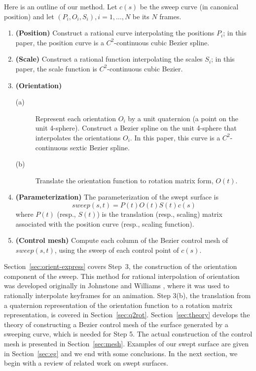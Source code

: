 \documentclass[times]{article}
\begin{document}
Here is an outline of our method.
Let $c(s)$ be the sweep curve (in canonical position) and 
let $(P_i,O_i,S_i), i = 1,\ldots,N$ be its $N$ frames.

\begin{enumerate}
\item
	{\bf (Position)} Construct a rational curve
	interpolating the positions $P_i$;
	in this paper, the position curve is 
	a $C^2$-continuous cubic Bezier spline.
\item
	{\bf (Scale)} Construct a rational function
	interpolating the scales $S_i$; in this paper, 
	the scale function is $C^2$-continuous cubic Bezier.
\item
	{\bf (Orientation)}
\begin{description}
\item[(a)]
	Represent each orientation $O_i$ by a unit quaternion
	(a point on the unit 4-sphere).
	Construct a Bezier spline on the unit 4-sphere
	that interpolates the orientations $O_i$.
	In this paper, this curve is a $C^2$-continuous sextic Bezier spline.
\item[(b)]
	Translate the orientation function to rotation matrix form, $O(t)$.
\end{description}
\item 
	{\bf (Parameterization)}
	The parameterization of the swept surface is
\begin{equation}
\label{eqn:matrix}
	sweep(s,t) = P(t)O(t)S(t)c(s)
\end{equation}
	where $P(t)$ (resp., $S(t)$) is the translation (resp., scaling)
	matrix associated with the position curve (resp., scaling function).
\item
	{\bf (Control mesh)}
	Compute each column of the Bezier control mesh of $sweep(s,t)$,
	using the sweep of each control point of $c(s)$.
\end{enumerate}

Section~\ref{sec:orient-express} covers Step~3,
the construction of the orientation component of the sweep.
This method for rational interpolation of orientation
was developed originally in Johnstone and Williams \cite{jjjimbo94a}, 
where it was used to rationally interpolate keyframes for an animation.
Step 3(b), the translation from a quaternion representation of the
orientation function to a rotation matrix representation, is covered
in Section~\ref{sec:q2rot}.
Section~\ref{sec:theory} develops the 
theory of constructing a Bezier control mesh of the surface generated
by a sweeping curve, which is needed for Step 5.
The actual construction of the control mesh is presented in 
Section~\ref{sec:mesh}.
Examples of our swept surface are given in Section~\ref{sec:eg}
and we end with some conclusions.
In the next section, we begin with a review of related work on swept surfaces.
\end{document}
